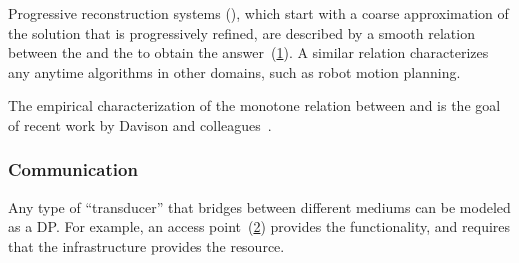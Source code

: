 \begin{example}
    Progressive reconstruction systems (\cite{locher16progressive}), which start with a coarse approximation of the solution that is progressively refined, are described by a smooth relation between the  and the  to obtain the answer~(\cref{fig:progressive}).
    A similar relation characterizes any anytime algorithms in other domains, such as robot motion planning.
\end{example}

\begin{figure}[h]
    \centering
    \caption{}
    \label{fig:progressive}
\end{figure}

\begin{example}
    The empirical characterization of the monotone relation between  and  is the goal of recent work by Davison and colleagues~\cite{nardi15introducing,zia16comparative}.
\end{example}

\subsubsection{Communication}

\begin{example}[Transducers]
    Any type of ``transducer'' that bridges between different mediums can be modeled as a DP.
    For example, an access point~(\cref{fig:accesspoint}) provides the  functionality, and requires that the infrastructure provides the  resource.
\end{example}

\begin{figure}[h]
    \centering
    \caption{}
    \label{fig:accesspoint}
\end{figure}


